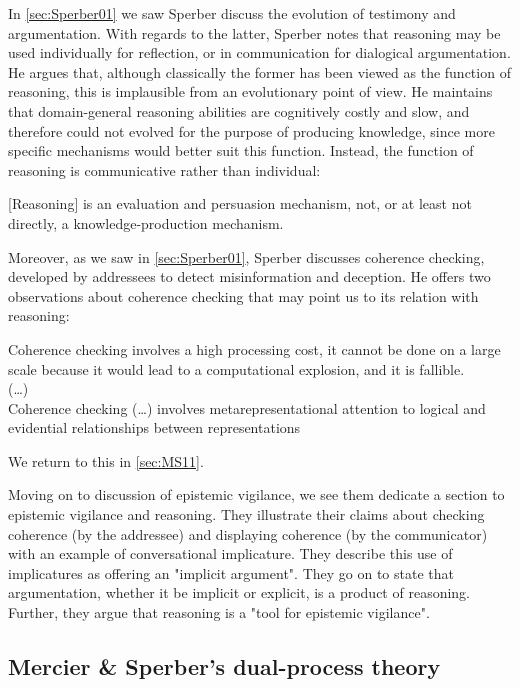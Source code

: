 In \cref{sec:Sperber01} we saw Sperber discuss the evolution of testimony and argumentation. With regards to the latter, Sperber notes that reasoning may be used individually for reflection, or in communication for dialogical argumentation. He argues that, although classically the former has been viewed as the function of reasoning, this is implausible from an evolutionary point of view. He maintains that domain-general reasoning abilities are cognitively costly and slow, and therefore could not evolved for the purpose of producing knowledge, since more specific mechanisms would better suit this function. Instead, the function of reasoning is communicative rather than individual:
\begin{quoting}
    {[Reasoning]} is an evaluation and persuasion mechanism, not, or at least not directly, a knowledge-production mechanism.
    \hfill \citep[p.~409]{Sperber01}
\end{quoting}
Moreover, as we saw in \cref{sec:Sperber01}, Sperber discusses coherence checking, developed by addressees to detect misinformation and deception. He offers two observations about coherence checking that may point us to its relation with reasoning:
\begin{quoting}
    Coherence checking involves a high processing cost, it cannot be done on a large scale because it would lead to a computational explosion, and it is fallible.
    \\ (\ldots) \\
    Coherence checking (\ldots) involves metarepresentational attention to logical and evidential relationships between representations
    \hfill \citep[p.~410]{Sperber01}
\end{quoting}
We return to this in \cref{sec:MS11}.

Moving on to  discussion of epistemic vigilance, we see them dedicate a section to epistemic vigilance and reasoning. They illustrate their claims about checking coherence (by the addressee) and displaying coherence (by the communicator) with an example of conversational implicature. They describe this use of implicatures as offering an "implicit argument".
They go on to state that argumentation, whether it be implicit or explicit, is a product of reasoning. Further, they argue that reasoning is a "tool for epistemic vigilance".

\subsection{Mercier \& Sperber's dual-process theory}
\label{sec:MS09}

